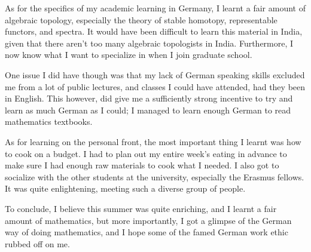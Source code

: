 \documentclass[12pt, notitlepage]{article}
\begin{document}
As for the specifics of my academic learning in Germany, I learnt a fair amount of algebraic topology,
especially the theory of stable homotopy, representable functors, and spectra. It would have been difficult
to learn this material in India, given that there aren't too many algebraic topologists in India. Furthermore,
I now know what I want to specialize in when I join graduate school.

One issue I did have though was that my lack of German speaking skills excluded me from a lot of public
lectures, and classes I could have attended, had they been in English. This however, did give me a sufficiently
strong incentive to try and learn as much German as I could; I managed to learn enough German to read mathematics
textbooks.

As for learning on the personal front, the most important thing I learnt was how to cook on a budget.
I had to plan out my entire week's eating in advance to make sure I had enough raw materials to cook what
I needed. I also got to socialize with the other students at the university, especially the Erasmus fellows.
It was quite enlightening, meeting such a diverse group of people.

To conclude, I believe this summer was quite enriching, and I learnt a fair amount of mathematics,
but more importantly, I got a glimpse of the German way of doing mathematics, and I hope some of the
famed German work ethic rubbed off on me.
\end{document}
